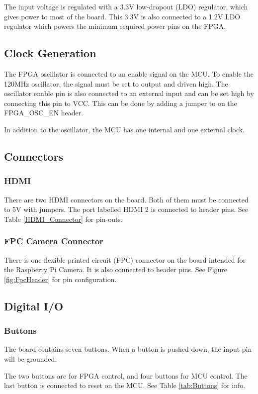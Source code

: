 The input voltage is regulated with a 3.3V low-dropout (LDO) regulator, which gives power to most of the board.
This 3.3V is also connected to a 1.2V LDO regulator which powers the minimum required power pins on the FPGA.

\subsection{Clock Generation}
The FPGA oscillator is connected to an enable signal on the MCU.
To enable the 120MHz oscillator, the signal must be set to output and driven high.
The oscillator enable pin is also connected to an external input and can be set high by connecting this pin to VCC.
This can be done by adding a jumper to on the FPGA\_OSC\_EN header.

In addition to the oscillator, the MCU has one internal and one external clock.

\subsection{Connectors}
\subsubsection{HDMI}
There are two HDMI connectors on the board.
Both of them must be connected to 5V with jumpers.
The port labelled HDMI 2 is connected to header pins.
See Table \ref{HDMI_Connector} for pin-outs.

\subsubsection{FPC Camera Connector}
There is one flexible printed circuit (FPC) connector on the board intended for the Raspberry Pi Camera.
It is also connected to header pins.
See Figure \ref{fig:FpcHeader} for pin configuration.

\subsection{Digital I/O}
\subsubsection{Buttons}
The board contains seven buttons.
When a button is pushed down, the input pin will be grounded.

The two buttons are for FPGA control, and four buttons for MCU control.
The last button is connected to reset on the MCU.
See Table \ref{tab:Buttons} for info.

